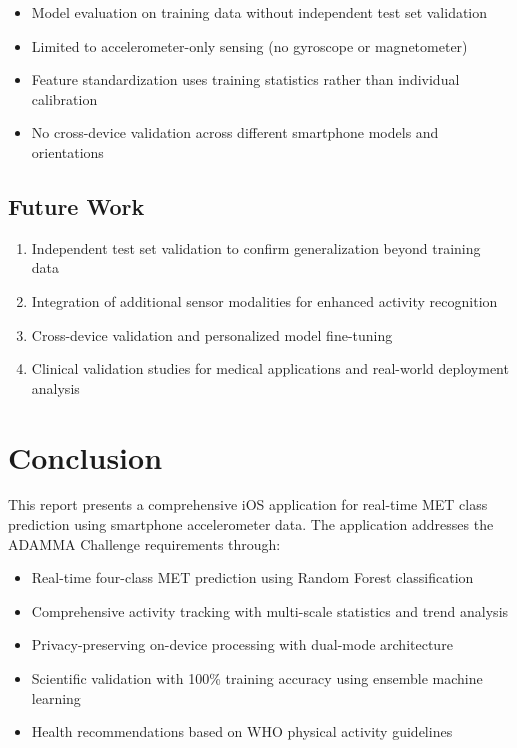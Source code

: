 \documentclass[11pt,a4paper]{article}
\begin{document}
\begin{itemize}
    \item Model evaluation on training data without independent test set validation
    \item Limited to accelerometer-only sensing (no gyroscope or magnetometer)
    \item Feature standardization uses training statistics rather than individual calibration
    \item No cross-device validation across different smartphone models and orientations
\end{itemize}

\subsection{Future Work}

\begin{enumerate}
    \item Independent test set validation to confirm generalization beyond training data
    \item Integration of additional sensor modalities for enhanced activity recognition
    \item Cross-device validation and personalized model fine-tuning
    \item Clinical validation studies for medical applications and real-world deployment analysis
\end{enumerate}

\section{Conclusion}

This report presents a comprehensive iOS application for real-time MET class prediction using smartphone accelerometer data. The application addresses the ADAMMA Challenge requirements through:

\begin{itemize}
    \item Real-time four-class MET prediction using Random Forest classification
    \item Comprehensive activity tracking with multi-scale statistics and trend analysis
    \item Privacy-preserving on-device processing with dual-mode architecture
    \item Scientific validation with 100\% training accuracy using ensemble machine learning
    \item Health recommendations based on WHO physical activity guidelines
\end{itemize}
\end{document}
